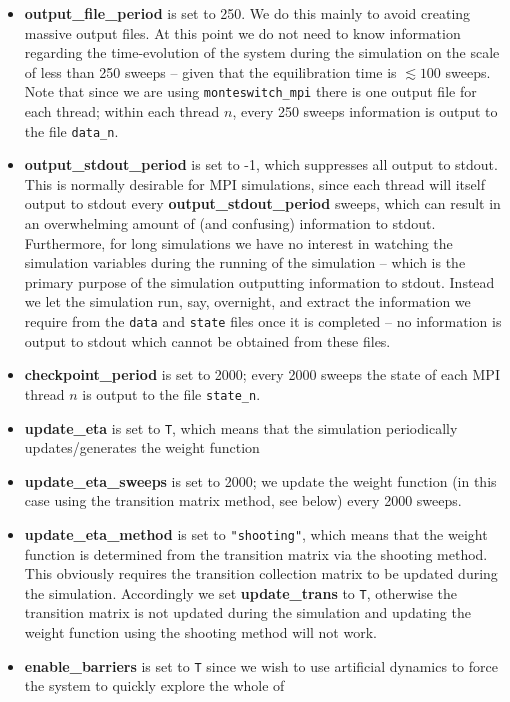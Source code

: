 \documentclass{report}
\begin{document}
\begin{itemize}
\item \textbf{output\_file\_period} is set to 250. We do this mainly to avoid creating massive output files. At this point we do not need to know 
  information regarding the time-evolution of the system during the simulation on the scale of less than 250 sweeps -- given that the equilibration time is
  $\lesssim 100$ sweeps. Note that since we are using \texttt{monteswitch\_mpi} there is one output file for each thread; within each thread $n$, every 
  250 sweeps information is output to the file \texttt{data\_n}.
\item \textbf{output\_stdout\_period} is set to -1, which suppresses all output to stdout. This is normally desirable for MPI simulations, since each thread 
  will itself output to stdout every \textbf{output\_stdout\_period} sweeps, which can result in an overwhelming amount of (and confusing) information to 
  stdout. 
  Furthermore, for long simulations we have no interest in watching the simulation variables during the running of the simulation -- which is the primary
  purpose of the simulation outputting information to stdout. Instead we let the simulation run, say, overnight, and extract the information we require
  from the \texttt{data} and \texttt{state} files once it is completed -- no information is output to stdout which cannot be obtained from these files.
\item \textbf{checkpoint\_period} is set to 2000; every 2000 sweeps the state of each MPI thread $n$ is output to the file \texttt{state\_n}.
\item \textbf{update\_eta} is set to \texttt{T}, which means that the simulation periodically updates/generates the weight function
\item \textbf{update\_eta\_sweeps} is set to 2000; we update the weight function (in this case using the transition matrix method, see below) every 2000 
  sweeps.
\item \textbf{update\_eta\_method} is set to \verb|"shooting"|, which means that the weight function is determined from the transition matrix via the 
  shooting method. This obviously requires the transition collection matrix to be updated during the simulation. 
  Accordingly we set \textbf{update\_trans} to \texttt{T}, otherwise
  the transition matrix is not updated during the simulation and updating the weight function using the shooting method will not work.
\item \textbf{enable\_barriers} is set to \texttt{T} since we wish to use artificial dynamics to force the system to quickly explore the whole of

\end{itemize}
\end{document}
